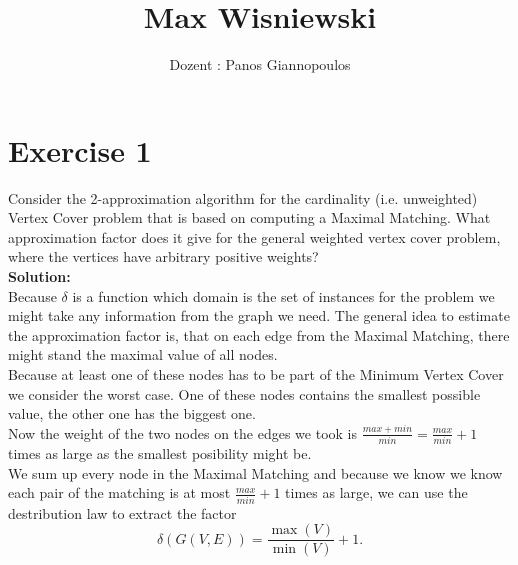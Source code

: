 \documentclass[11pt,a4paper,ngerman]{article}
\date{}
\title{Max Wisniewski}
\author{Dozent : Panos Giannopoulos}
\begin{document}

\renewcommand{\figurename}{Figure}

\maketitle
\thispagestyle{fancy}


\section*{Exercise 1}

Consider the 2-approximation algorithm for the cardinality (i.e. unweighted) Vertex Cover problem that is based on computing a Maximal Matching. What approximation factor does it give for the general weighted vertex cover problem, where the vertices have arbitrary positive weights?\\

\textbf{Solution:}\\
Because $\delta$ is a function which domain is the set of instances for the problem we might take any information from the graph we need. The general idea to estimate the approximation factor is, that on each edge from the Maximal Matching, there might stand the maximal value of all nodes.\\
Because at least one of these nodes has to be part of the Minimum Vertex Cover we consider the worst case. One of these nodes contains the smallest possible value, the other one has the biggest one.\\
Now the weight of the two nodes on the edges we took is $\frac{max+min}{min} = \frac{max}{min}+1$ times as large as the smallest posibility might be.\\
We sum up every node in the Maximal Matching and because we know we know each pair of the matching is at most $\frac{max}{min}+1$ times as large, we can use the destribution law to extract the factor 
$$
	\delta (G(V,E)) = \frac{\max (V)}{\min (V)} + 1.
$$
\end{document}
